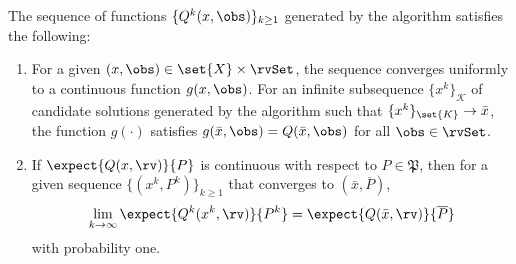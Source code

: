 \documentclass[11pt]{article}
\newcommand{\probset}{\mathfrak{P}}
\begin{document}
\begin{proposition} \label{lemma:recourseApprox}
The sequence of functions $\{Q^k(x,\obs)\}_{k \geq 1}$ generated by the algorithm satisfies the following:
\begin{enumerate}[label=(\alph{enumi})]
    \item For a given $(x,\obs) \in \set{X} \times \rvSet$, the sequence converges uniformly to a continuous function $g(x,\obs)$. For an infinite subsequence $\{x^k\}_\mathcal{K}$ of candidate solutions generated by the algorithm such that $\{x^k\}_{\set{K}} \rightarrow \bar{x}$, the function $g(\cdot)$ satisfies $g(\bar{x}, \obs) = Q(\bar{x},\obs)$ for all $\obs \in \rvSet$. \label{lemma:uniformConvergence}
    \item If $\expect{Q(x,\rv)}{P}$ is continuous with respect to $P \in \probset$, then for a given sequence $\{(x^k, P^k)\}_{k \geq 1}$ that converges to $(\bar{x}, \overline{P})$,  
    \begin{align*}
   \lim_{k\rightarrow \infty}\expect{Q^k(x^k, \rv)}{P^k} = \expect{Q(\bar{x}, \rv)}{\overline{P}}
    \end{align*}
    with probability one. \label{lemma:expectedRecourse}
\end{enumerate}
\end{proposition}
\end{document}
